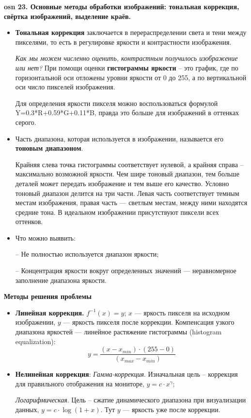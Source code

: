 \textbf{\LARGE osn 23. Основные методы обработки изображений: тональная коррекция, свёртка изображений, выделение краёв.}


\begin{itemize}
\item \textbf{Тональная коррекция} заключается в перераспределении света и тени между пикселями, то есть в регулировке яркости и контрастности изображения. 

\textit{ Как мы можем численно оценить, контрастным получилось изображение или нет?} При помощи оценки \textbf{гистограммы яркости} -- это график, где по горизонтальной оси отложены уровни яркости от 0 до 255, а по вертикальной оси число пикселей изображения.

Для определения яркости пикселя можно воспользоваться формулой Y=0.3*R+0.59*G+0.11*B, правда это больше для изображений в оттенках серого.


\item Часть диапазона, которая используется в изображении, называется его \textbf{тоновым диапазоном}. 

Крайняя слева точка гистограммы соответствует нулевой, а крайняя справа -- максимально возможной яркости. Чем шире тоновый диапазон, тем больше деталей может передать изображение и тем выше его качество. Условно тоновый диапазон делится на три части. Левая часть соответствует темным местам изображения, правая часть --- светлым местам, между ними находятся средние тона. В идеальном изображении присутствуют пиксели всех оттенков.
\item Что можно выявить:
    \item[--] Не полностью используется диапазон яркости;
    \item[--] Концентрация яркости вокруг определенных значений --- неравномерное заполнение диапазона яркости.
\end{itemize}



\textbf{Методы решения проблемы}
\begin{itemize}
\item \textbf{Линейная коррекция.} 
$f^{-1}(x) = y$; $x$ --- яркость пикселя на исходном изображении, $y$ --- яркость пикселя после коррекции. Компенсация узкого диапазона яркостей --- линейное растяжение гистограммы (histogram equalization):
$$y = \frac{(x-x_{min})\cdot(255-0)}{(x_{max} - x_{min})}$$

\item \textbf{Нелинейная коррекция}:\newline
\textit{Гамма-коррекция}. Изначальная цель -- коррекция для правильного отображения на мониторе, $y = c \cdot x^\gamma$;

\textit{Логарифмическая}. Цель -- сжатие динамического диапазона при визуализации данных, $y = c \cdot \log(1 + x)$. Тут $y$ --- яркость уже после коррекции.
\end{itemize}

